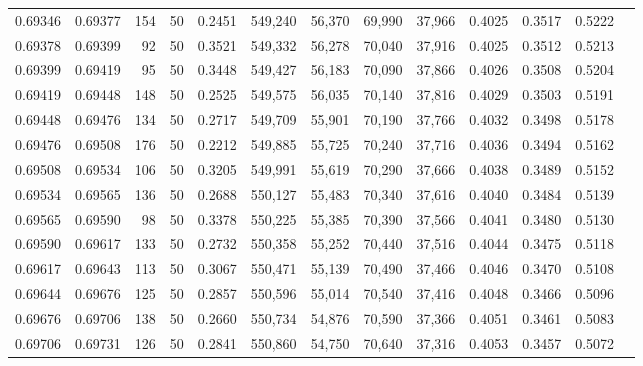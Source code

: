 \begin{tabular}{rrrrrrrrrrrrr}
0.69346 & 0.69377 &   154 &  50 &                                     0.2451 & 549,240 &  56,370 &  69,990 &  37,966 & 0.4025 & 0.3517 & 0.5222 \\
0.69378 & 0.69399 &    92 &  50 &                                     0.3521 & 549,332 &  56,278 &  70,040 &  37,916 & 0.4025 & 0.3512 & 0.5213 \\
0.69399 & 0.69419 &    95 &  50 &                                     0.3448 & 549,427 &  56,183 &  70,090 &  37,866 & 0.4026 & 0.3508 & 0.5204 \\
0.69419 & 0.69448 &   148 &  50 &                                     0.2525 & 549,575 &  56,035 &  70,140 &  37,816 & 0.4029 & 0.3503 & 0.5191 \\
0.69448 & 0.69476 &   134 &  50 &                                     0.2717 & 549,709 &  55,901 &  70,190 &  37,766 & 0.4032 & 0.3498 & 0.5178 \\
0.69476 & 0.69508 &   176 &  50 &                                     0.2212 & 549,885 &  55,725 &  70,240 &  37,716 & 0.4036 & 0.3494 & 0.5162 \\
0.69508 & 0.69534 &   106 &  50 &                                     0.3205 & 549,991 &  55,619 &  70,290 &  37,666 & 0.4038 & 0.3489 & 0.5152 \\
0.69534 & 0.69565 &   136 &  50 &                                     0.2688 & 550,127 &  55,483 &  70,340 &  37,616 & 0.4040 & 0.3484 & 0.5139 \\
0.69565 & 0.69590 &    98 &  50 &                                     0.3378 & 550,225 &  55,385 &  70,390 &  37,566 & 0.4041 & 0.3480 & 0.5130 \\
0.69590 & 0.69617 &   133 &  50 &                                     0.2732 & 550,358 &  55,252 &  70,440 &  37,516 & 0.4044 & 0.3475 & 0.5118 \\
0.69617 & 0.69643 &   113 &  50 &                                     0.3067 & 550,471 &  55,139 &  70,490 &  37,466 & 0.4046 & 0.3470 & 0.5108 \\
0.69644 & 0.69676 &   125 &  50 &                                     0.2857 & 550,596 &  55,014 &  70,540 &  37,416 & 0.4048 & 0.3466 & 0.5096 \\
0.69676 & 0.69706 &   138 &  50 &                                     0.2660 & 550,734 &  54,876 &  70,590 &  37,366 & 0.4051 & 0.3461 & 0.5083 \\
0.69706 & 0.69731 &   126 &  50 &                                     0.2841 & 550,860 &  54,750 &  70,640 &  37,316 & 0.4053 & 0.3457 & 0.5072 \\

\end{tabular}
